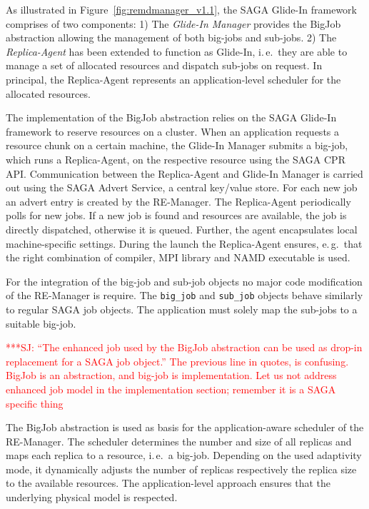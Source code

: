 \documentclass{rspublic}
\newcommand{\jhanote}[1]{ {\textcolor{red} { ***SJ: #1 }}}
\newcommand{\jhanote}[1]{}
\newcommand{\replicaagent}[1]{Replica-Agent }
\begin{document}
As illustrated in Figure~\ref{fig:remdmanager_v1.1}, the SAGA Glide-In
framework comprises of two components: 1) The \emph{Glide-In Manager}
provides the BigJob abstraction allowing the management of both
big-jobs and sub-jobs.  2) The \emph{Replica-Agent} has been extended
to function as Glide-In, i.\,e.\ they are able to manage a set of
allocated resources and dispatch sub-jobs on request. 
In principal, the Replica-Agent represents an application-level
scheduler for the allocated resources.  
            
The implementation of the BigJob abstraction relies on the SAGA 
Glide-In framework to reserve resources on a cluster.
When an application requests a resource chunk on a certain machine, 
the Glide-In Manager submits a big-job, which runs a Replica-Agent, 
on the respective resource using the SAGA CPR API.
Communication between the Replica-Agent and Glide-In
Manager is carried out using the SAGA Advert Service, a central
key/value store. For each new job an advert entry is created by the
RE-Manager. The \replicaagent\ periodically polls for new jobs.  If a
new job is found and resources are available, the job is directly dispatched,
otherwise it is queued. Further, the agent encapsulates local machine-specific
settings. During the launch the \replicaagent\ ensures, e.\,g.\ 
that the right combination of compiler, MPI library and NAMD 
executable is used.                

For the integration of the big-job and sub-job objects
no major code modification of the RE-Manager is require. The \texttt{big\_job}
and \texttt{sub\_job} objects behave similarly to regular SAGA job objects.
The application must solely map the sub-jobs to a suitable big-job.

\jhanote{``The enhanced job
  used by the BigJob abstraction can be used as drop-in replacement
  for a SAGA job object.'' The previous line in quotes, is
  confusing. BigJob is an abstraction, and big-job is
  implementation. Let us not address enhanced job model in the
  implementation section; remember it is a SAGA specific thing}

The BigJob abstraction is used as basis for the application-aware scheduler
of the RE-Manager. The scheduler determines the number and size of all replicas and
maps each replica to a resource, i.\,e.\ a big-job. Depending on the used adaptivity mode,
it dynamically adjusts the number of replicas respectively the replica 
size to the available resources. The application-level approach ensures 
that the underlying physical model is respected.
\end{document}
